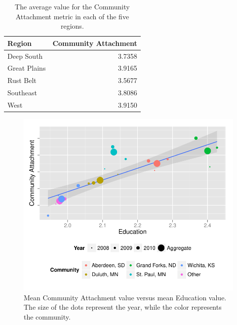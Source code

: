 \documentclass[11pt]{article}\usepackage{knitr}
\begin{document}
\begin{table}[ht]
\centering
\begin{tabular}{lr}
  \hline
Region & Community Attachment \\ 
  \hline
Deep South & 3.7358 \\ 
  Great Plains & 3.9165 \\ 
  Rust Belt & 3.5677 \\ 
  Southeast & 3.8086 \\ 
  West & 3.9150 \\ 
   \hline
\end{tabular}
\caption{The average value for the Community Attachment metric in each of the five regions.} 
\label{tbl:cce_table}
\end{table}



\begin{knitrout}
\color{fgcolor}\begin{figure}[H]


{\centering \includegraphics[width=\maxwidth]{figure/gp_two} 

}

\caption[Mean Community Attachment value versus mean Education value]{Mean Community Attachment value versus mean Education value. The size of the dots represent the year, while the color represents the community.\label{fig:gp_two}}
\end{figure}


\end{knitrout}
\end{document}
